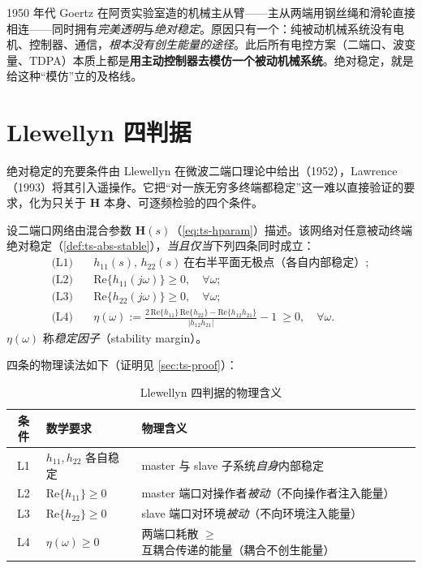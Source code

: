 \begin{insight}
1950 年代 Goertz 在阿贡实验室造的机械主从臂——主从两端用钢丝绳和滑轮直接相连——同时拥有\emph{完美透明}与\emph{绝对稳定}。原因只有一个：纯被动机械系统没有电机、控制器、通信，\emph{根本没有创生能量的途径}。此后所有电控方案（二端口、波变量、TDPA）本质上都是\textbf{用主动控制器去模仿一个被动机械系统}。绝对稳定，就是给这种“模仿”立的及格线。
\end{insight}

\section{Llewellyn 四判据}
\label{sec:ts-criteria}

绝对稳定的充要条件由 Llewellyn 在微波二端口理论中给出（1952），Lawrence（1993）将其引入遥操作\cite{lawrence1993stability}。它把“对一族无穷多终端都稳定”这一难以直接验证的要求，化为只关于 $\mathbf H$ 本身、可逐频检验的四个条件。

\begin{theorem}\label{thm:ts-llewellyn}
设二端口网络由混合参数 $\mathbf H(s)$（\cref{eq:ts-hparam}）描述。该网络对任意被动终端绝对稳定（\cref{def:ts-abs-stable}），\emph{当且仅当}下列四条同时成立：
\begin{align}
  \text{(L1)}\quad & h_{11}(s),\,h_{22}(s)\ \text{在右半平面无极点（各自内部稳定）};\label{eq:ts-L1}\\
  \text{(L2)}\quad & \mathrm{Re}\{h_{11}(j\omega)\}\ge0,\quad\forall\omega;\label{eq:ts-L2}\\
  \text{(L3)}\quad & \mathrm{Re}\{h_{22}(j\omega)\}\ge0,\quad\forall\omega;\label{eq:ts-L3}\\
  \text{(L4)}\quad & \eta(\omega):=\frac{2\,\mathrm{Re}\{h_{11}\}\,\mathrm{Re}\{h_{22}\}-\mathrm{Re}\{h_{12}h_{21}\}}{|h_{12}h_{21}|}-1\ \ge0,\quad\forall\omega.\label{eq:ts-L4}
\end{align}
$\eta(\omega)$ 称\emph{稳定因子}（stability margin）。
\end{theorem}

\noindent 四条的物理读法如下（证明见 \cref{sec:ts-proof}）：

\begin{table}[H]\centering\small
\caption{Llewellyn 四判据的物理含义}
\label{tab:ts-criteria-meaning}
\begin{tabular}{cll}
\toprule
条件 & 数学要求 & 物理含义 \\
\midrule
L1 & $h_{11},h_{22}$ 各自稳定 & master 与 slave 子系统\emph{自身}内部稳定 \\
L2 & $\mathrm{Re}\{h_{11}\}\ge0$ & master 端口对操作者\emph{被动}（不向操作者注入能量） \\
L3 & $\mathrm{Re}\{h_{22}\}\ge0$ & slave 端口对环境\emph{被动}（不向环境注入能量） \\
L4 & $\eta(\omega)\ge0$ & 两端口耗散 $\ge$ 互耦合传递的能量（耦合不创生能量） \\
\bottomrule
\end{tabular}
\end{table}


